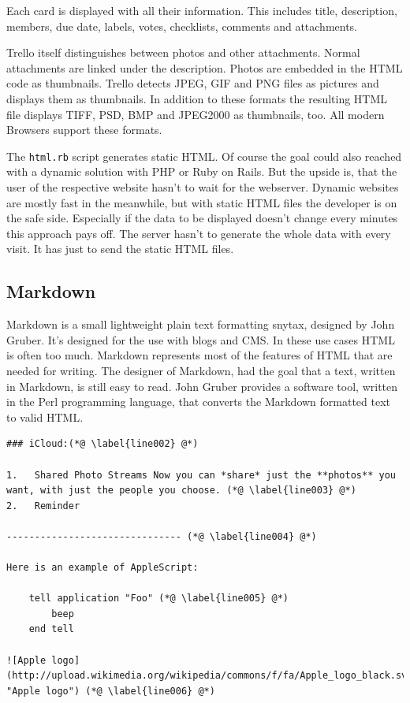 Each card is displayed with all their information. This includes title, description, members, due date, labels, votes, checklists, comments and attachments.

Trello itself distinguishes between photos and other attachments. Normal attachments are linked under the description. Photos are embedded in the HTML code as thumbnails. Trello detects JPEG, GIF and PNG files as pictures and displays them as thumbnails. In addition to these formats the resulting HTML file displays TIFF, PSD, BMP and JPEG2000 as thumbnails, too. All modern Browsers support these formats.

The \texttt{html.rb} script generates static HTML. Of course the goal could also reached with a dynamic solution with PHP or Ruby on Rails. But the upside is, that the user of the respective website hasn't to wait for the webserver. Dynamic websites are mostly fast in the meanwhile, but with static HTML files the developer is on the safe side. Especially if the data to be displayed doesn't change every minutes this approach pays off. The server hasn't to generate the whole data with every visit. It has just to send the static HTML files.

\subsection{Markdown}
Markdown is a small lightweight plain text formatting snytax, designed by John Gruber. It's designed for the use with blogs and CMS. In these use cases HTML is often too much. Markdown represents most of the features of HTML that are needed for writing. The designer of Markdown, had the goal that a text, written in Markdown, is still easy to read. John Gruber provides a software tool, written in the Perl programming language, that converts the Markdown formatted text to valid HTML. \cite{markdown}

\begin{lstlisting}[aboveskip=1\baselineskip, style=bash, caption=Example for a text written in Markdown., label=listing006]
### iCloud:(*@ \label{line002} @*)

1.   Shared Photo Streams Now you can *share* just the **photos** you want, with just the people you choose. (*@ \label{line003} @*)
2.   Reminder

------------------------------- (*@ \label{line004} @*)

Here is an example of AppleScript:

    tell application "Foo" (*@ \label{line005} @*)
        beep
    end tell

![Apple logo](http://upload.wikimedia.org/wikipedia/commons/f/fa/Apple_logo_black.svg "Apple logo") (*@ \label{line006} @*)
\end{lstlisting}


